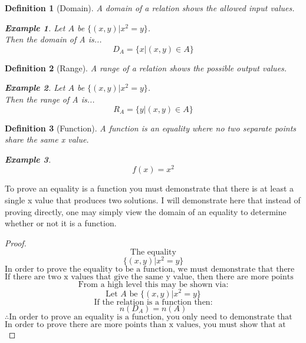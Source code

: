 \documentclass{amsart}
\newtheorem{exa}{Example}
\newtheorem{defn}{Definition}
\begin{document}
	\begin{defn}[Domain]
		A domain of a relation shows the allowed input values.
		\begin{exa}
			Let $A$ be $\{(x,y)|x^2=y\}$.\\
			Then the domain of A is...\\
			$$D_A=\{x|(x,y)\in A\}$$
		\end{exa}
	\end{defn}
	\begin{defn}[Range]
		A range of a relation shows the possible output
		values.
		\begin{exa}
			Let $A$ be $\{(x,y)|x^2=y\}$.\\
			Then the range of A is...\\
			$$R_A=\{y|(x,y)\in A\}$$
		\end{exa}
	\end{defn}
	\begin{defn}[Function]
		A function is an equality where no two separate
		points share the same x value.
		\begin{exa}
			$$f(x)=x^2$$
		\end{exa}
	\end{defn}
	To prove an equality is a function you must demonstrate
	that there is at least a single x value that produces
	two solutions. I will demonstrate here that instead of
	proving directly, one may simply view the domain of an
	equality to determine whether or not it is a function.
	\begin{proof}
		$$\text{The equality}$$
		$$\{(x,y)|x^2=y\}$$
		$$\text{In order to prove the equality to be a
		function, we must demonstrate that there are at
		least two points with the same y value.}$$
		$$\text{If there are two x values that give the
		same y value, then there are more points then there
		are x values.}$$
		$$\text{From a high level this may be shown via:}$$
		$$\text{Let $A$ be }\{(x,y)|x^2=y\}$$
		$$\text{If the relation is a function then:}$$
		$$n(D_A)=n(A)$$
		$$\therefore\text{In order to prove an equality is
		a function, you only need to demonstrate that there
		are more points than there are x values.}$$
		$$\text{In order to prove there are more points
		than x values, you must show that at least one
		x value gives two points.}$$
		\end{proof}
\end{document}
